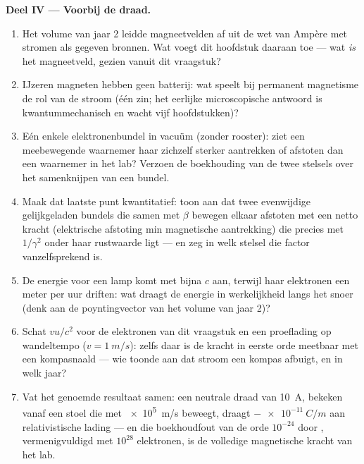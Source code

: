 \begin{problem}
\medskip\noindent\textbf{Deel IV --- Voorbij de draad.}
\begin{enumerate}[resume]
  \item Het volume van jaar 2 leidde magneetvelden af uit de wet van
        Ampère met stromen als gegeven bronnen. Wat voegt dit
        hoofdstuk daaraan toe --- wat \emph{is} het magneetveld, gezien
        vanuit dit vraagstuk?
  \item IJzeren magneten hebben geen batterij: wat speelt bij permanent
        magnetisme de rol van de stroom (één zin; het eerlijke
        microscopische antwoord is kwantummechanisch en wacht vijf
        hoofdstukken)?
  \item Eén enkele elektronenbundel in vacuüm (zonder rooster): ziet een
        meebewegende waarnemer haar zichzelf sterker aantrekken of
        afstoten dan een waarnemer in het lab? Verzoen de boekhouding
        van de twee stelsels over het samenknijpen van een bundel.
  \item Maak dat laatste punt kwantitatief: toon aan dat twee
        evenwijdige gelijkgeladen bundels die samen met $\beta$ bewegen
        elkaar afstoten met een netto kracht (elektrische afstoting min
        magnetische aantrekking) die precies met $1/\gamma^2$ onder haar
        rustwaarde ligt --- en zeg in welk stelsel die factor
        vanzelfsprekend is.
  \item De energie voor een lamp komt met bijna $c$ aan, terwijl haar
        elektronen een meter per uur driften: wat draagt de energie in
        werkelijkheid langs het snoer (denk aan de poyntingvector van
        het volume van jaar 2)?
  \item Schat $vu/c^2$ voor de elektronen van dit vraagstuk en een
        proeflading op wandeltempo ($v = \qty{1}{m/s}$): zelfs daar is
        de kracht in eerste orde meetbaar met een kompasnaald --- wie
        toonde aan dat stroom een kompas afbuigt, en in welk jaar?
  \item Vat het genoemde resultaat samen: een neutrale draad van
        \qty{10}{A}, bekeken vanaf een stoel die met \qty{e5}{m/s}
        beweegt, draagt $-\qty{e-11}{C/m}$ aan relativistische lading
        --- en die boekhoudfout van de orde $10^{-24}$ door ,
        vermenigvuldigd met $10^{28}$ elektronen, is de volledige
        magnetische kracht van het lab.
\end{enumerate}
\end{problem}
